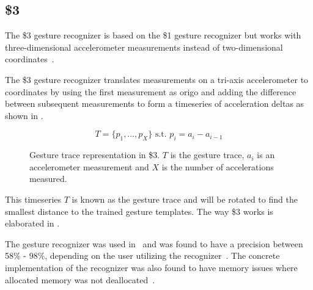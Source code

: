 


\subsection{\$3}

The \$3 gesture recognizer is based on the \$1 gesture recognizer but works with three-dimensional accelerometer measurements instead of two-dimensional coordinates~\cite{threedollar}.

The \$3 gesture recognizer translates measurements on a tri-axis accelerometer to coordinates by using the first measurement as origo and adding the difference between subsequent measurements to form a timeseries of acceleration deltas as shown in .

\begin{figure}[h]
\[ T = \{p_1,\ldots,p_X\} \text{ s.t. } p_i=a_i-a_{i-1} \]
\caption{Gesture trace representation in \$3. $T$ is the gesture trace, $a_i$ is an accelerometer measurement and $X$ is the number of accelerations measured.}
\label{eq:acceleration-timeseries}
\end{figure}

This timeseries $T$ is known as the gesture trace and will be rotated to find the smallest distance to the trained gesture templates.
The way \$3 works is elaborated in .

The gesture recognizer was used in~\cite{prespecialisation} and was found to have a precision between 58\% - 98\%, depending on the user utilizing the recognizer~\cite[p. 344]{threedollar}. The concrete implementation of the recognizer was also found to have memory issues where allocated memory was not deallocated~\cite[p. 54]{prespecialisation}.

